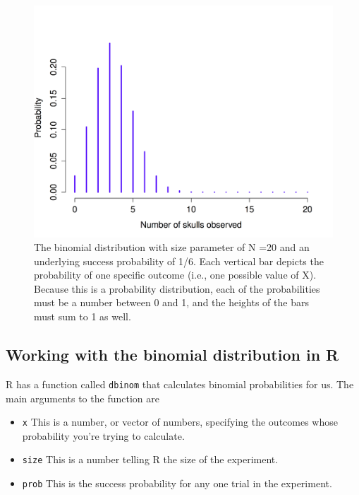 \documentclass[]{book}
\begin{document}
\begin{figure}
\centering
\includegraphics{navarro_img/probability/binomSkulls20-eps-converted-to.png}
\caption{\label{fig:4binomial1}The binomial distribution with size parameter of N =20 and an underlying success probability of 1/6. Each vertical bar depicts the probability of one specific outcome (i.e., one possible value of X). Because this is a probability distribution, each of the probabilities must be a number between 0 and 1, and the heights of the bars must sum to 1 as well.}
\end{figure}

\hypertarget{working-with-the-binomial-distribution-in-r}{%
\subsection{Working with the binomial distribution in R}\label{working-with-the-binomial-distribution-in-r}}

R has a function called \texttt{dbinom} that calculates binomial probabilities for us. The main arguments to the function are

\begin{itemize}
\item
  \texttt{x} This is a number, or vector of numbers, specifying the outcomes whose probability you're trying to calculate.
\item
  \texttt{size} This is a number telling R the size of the experiment.
\item
  \texttt{prob} This is the success probability for any one trial in the experiment.
\end{itemize}
\end{document}

